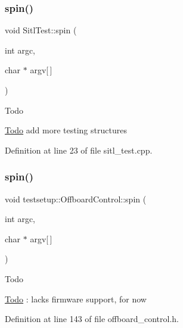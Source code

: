 \subsubsection{\texorpdfstring{spin()}{spin()}\hspace{0.1cm}{\footnotesize\ttfamily [1/2]}}
{\footnotesize\ttfamily void Sitl\+Test\+::spin (\begin{DoxyParamCaption}\item[{int}]{argc,  }\item[{char $\ast$}]{argv\mbox{[}$\,$\mbox{]} }\end{DoxyParamCaption})\hspace{0.3cm}{\ttfamily [static]}}

\begin{DoxyRefDesc}{Todo}
\item[\mbox{\hyperlink{todo__todo000018}{Todo}}]add more testing structures \end{DoxyRefDesc}


Definition at line 23 of file sitl\+\_\+test.\+cpp.

\mbox{\label{group__sitl__test_ga2750006357c60814f9ea8fdc1fb0d379}} 
\subsubsection{\texorpdfstring{spin()}{spin()}\hspace{0.1cm}{\footnotesize\ttfamily [2/2]}}
{\footnotesize\ttfamily void testsetup\+::\+Offboard\+Control\+::spin (\begin{DoxyParamCaption}\item[{int}]{argc,  }\item[{char $\ast$}]{argv\mbox{[}$\,$\mbox{]} }\end{DoxyParamCaption})\hspace{0.3cm}{\ttfamily [inline]}}

\begin{DoxyRefDesc}{Todo}
\item[\mbox{\hyperlink{todo__todo000013}{Todo}}]\+: lacks firmware support, for now \end{DoxyRefDesc}


Definition at line 143 of file offboard\+\_\+control.\+h.

\mbox{\label{group__sitl__test_gaa1e6e5d6eda73c0fd35932f562fc9537}} 
